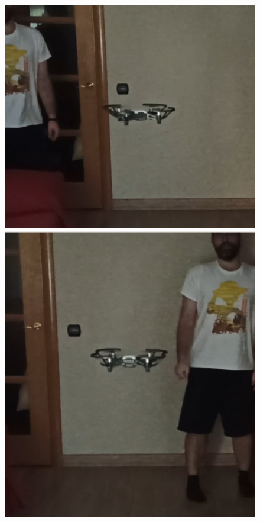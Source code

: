 \begin{figure}[!htb]
    \includegraphics[width=\linewidth]{figures/real/giroR_1.png}
\endminipage\hfill
{}
    \includegraphics[width=\linewidth]{figures/real/giroR_2.png}

\end{figure}
